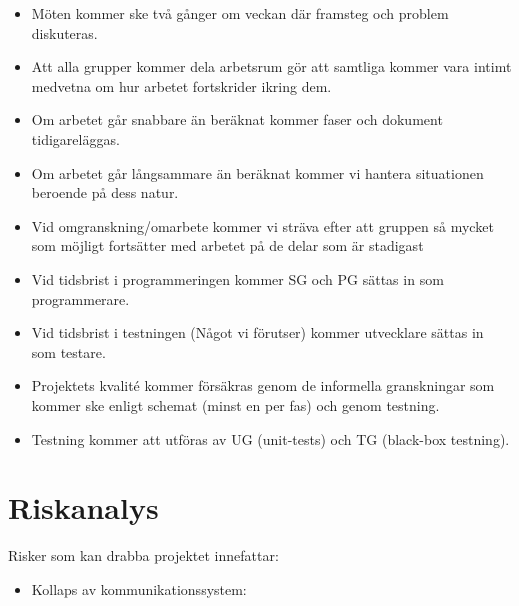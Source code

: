 \documentclass[paper=a4, fontsize=11pt,twoside]{article}
\begin{document}
\begin{itemize}
\item Möten kommer ske två gånger om veckan där framsteg och problem diskuteras.
\item Att alla grupper kommer dela arbetsrum gör att samtliga kommer vara intimt medvetna om hur arbetet fortskrider ikring dem.
\item Om arbetet går snabbare än beräknat kommer faser och dokument tidigareläggas.
\item Om arbetet går långsammare än beräknat kommer vi hantera situationen beroende på dess natur.
\item Vid omgranskning/omarbete kommer vi sträva efter att gruppen så mycket som möjligt fortsätter med arbetet på de delar som är stadigast
\item Vid tidsbrist i programmeringen kommer SG och PG sättas in som programmerare.
\item Vid tidsbrist i testningen (Något vi förutser) kommer utvecklare sättas in som testare.
\item Projektets kvalité kommer försäkras genom de informella granskningar som kommer ske enligt schemat (minst en per fas) och genom testning.
\item Testning kommer att utföras av UG (unit-tests) och TG (black-box testning).
\end{itemize}

\section{Riskanalys}

Risker som kan drabba projektet innefattar: 
\begin{itemize}
\item Kollaps av kommunikationssystem: {\color{red}{Vill diskutera}}
\end{itemize}
\end{document}
